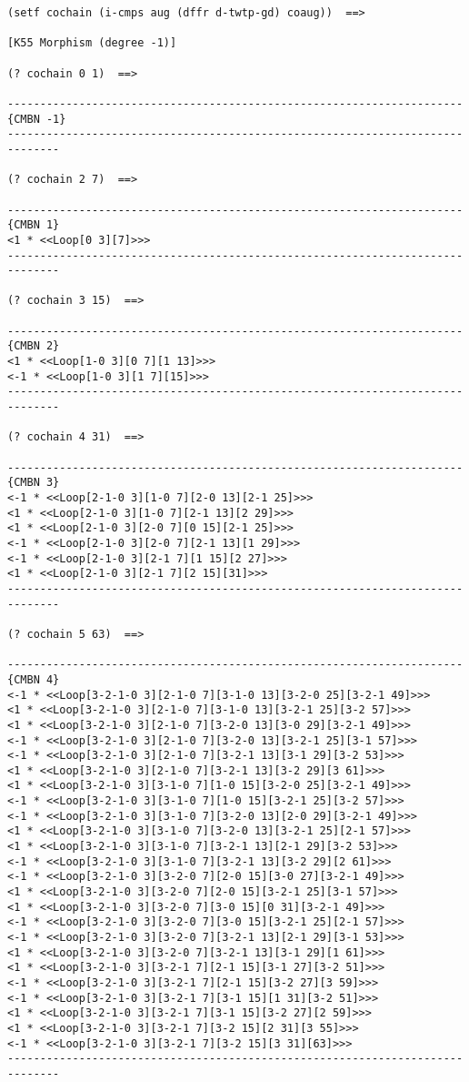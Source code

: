 {\footnotesize\begin{verbatim}
(setf cochain (i-cmps aug (dffr d-twtp-gd) coaug))  ==>

[K55 Morphism (degree -1)]

(? cochain 0 1)  ==>

----------------------------------------------------------------------{CMBN -1}
------------------------------------------------------------------------------

(? cochain 2 7)  ==>

----------------------------------------------------------------------{CMBN 1}
<1 * <<Loop[0 3][7]>>>
------------------------------------------------------------------------------

(? cochain 3 15)  ==>

----------------------------------------------------------------------{CMBN 2}
<1 * <<Loop[1-0 3][0 7][1 13]>>>
<-1 * <<Loop[1-0 3][1 7][15]>>>
------------------------------------------------------------------------------

(? cochain 4 31)  ==>

----------------------------------------------------------------------{CMBN 3}
<-1 * <<Loop[2-1-0 3][1-0 7][2-0 13][2-1 25]>>>
<1 * <<Loop[2-1-0 3][1-0 7][2-1 13][2 29]>>>
<1 * <<Loop[2-1-0 3][2-0 7][0 15][2-1 25]>>>
<-1 * <<Loop[2-1-0 3][2-0 7][2-1 13][1 29]>>>
<-1 * <<Loop[2-1-0 3][2-1 7][1 15][2 27]>>>
<1 * <<Loop[2-1-0 3][2-1 7][2 15][31]>>>
------------------------------------------------------------------------------

(? cochain 5 63)  ==>

----------------------------------------------------------------------{CMBN 4}
<-1 * <<Loop[3-2-1-0 3][2-1-0 7][3-1-0 13][3-2-0 25][3-2-1 49]>>>
<1 * <<Loop[3-2-1-0 3][2-1-0 7][3-1-0 13][3-2-1 25][3-2 57]>>>
<1 * <<Loop[3-2-1-0 3][2-1-0 7][3-2-0 13][3-0 29][3-2-1 49]>>>
<-1 * <<Loop[3-2-1-0 3][2-1-0 7][3-2-0 13][3-2-1 25][3-1 57]>>>
<-1 * <<Loop[3-2-1-0 3][2-1-0 7][3-2-1 13][3-1 29][3-2 53]>>>
<1 * <<Loop[3-2-1-0 3][2-1-0 7][3-2-1 13][3-2 29][3 61]>>>
<1 * <<Loop[3-2-1-0 3][3-1-0 7][1-0 15][3-2-0 25][3-2-1 49]>>>
<-1 * <<Loop[3-2-1-0 3][3-1-0 7][1-0 15][3-2-1 25][3-2 57]>>>
<-1 * <<Loop[3-2-1-0 3][3-1-0 7][3-2-0 13][2-0 29][3-2-1 49]>>>
<1 * <<Loop[3-2-1-0 3][3-1-0 7][3-2-0 13][3-2-1 25][2-1 57]>>>
<1 * <<Loop[3-2-1-0 3][3-1-0 7][3-2-1 13][2-1 29][3-2 53]>>>
<-1 * <<Loop[3-2-1-0 3][3-1-0 7][3-2-1 13][3-2 29][2 61]>>>
<-1 * <<Loop[3-2-1-0 3][3-2-0 7][2-0 15][3-0 27][3-2-1 49]>>>
<1 * <<Loop[3-2-1-0 3][3-2-0 7][2-0 15][3-2-1 25][3-1 57]>>>
<1 * <<Loop[3-2-1-0 3][3-2-0 7][3-0 15][0 31][3-2-1 49]>>>
<-1 * <<Loop[3-2-1-0 3][3-2-0 7][3-0 15][3-2-1 25][2-1 57]>>>
<-1 * <<Loop[3-2-1-0 3][3-2-0 7][3-2-1 13][2-1 29][3-1 53]>>>
<1 * <<Loop[3-2-1-0 3][3-2-0 7][3-2-1 13][3-1 29][1 61]>>>
<1 * <<Loop[3-2-1-0 3][3-2-1 7][2-1 15][3-1 27][3-2 51]>>>
<-1 * <<Loop[3-2-1-0 3][3-2-1 7][2-1 15][3-2 27][3 59]>>>
<-1 * <<Loop[3-2-1-0 3][3-2-1 7][3-1 15][1 31][3-2 51]>>>
<1 * <<Loop[3-2-1-0 3][3-2-1 7][3-1 15][3-2 27][2 59]>>>
<1 * <<Loop[3-2-1-0 3][3-2-1 7][3-2 15][2 31][3 55]>>>
<-1 * <<Loop[3-2-1-0 3][3-2-1 7][3-2 15][3 31][63]>>>
------------------------------------------------------------------------------
\end{verbatim}}
